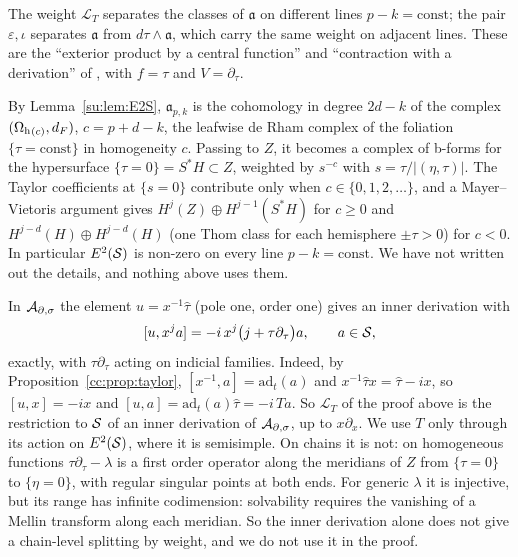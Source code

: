 The weight \(\mathcal L_T\) separates the classes of \(\mathfrak a\) on
different lines \(p-k=\mathrm{const}\); the pair \(\varepsilon,\iota\)
separates \(\mathfrak a\) from \(d\tau\wedge\mathfrak a\), which carry
the same weight on adjacent lines. These are the ``exterior product by a
central function'' and ``contraction with a derivation'' of
\cite[Prop.~5.1]{LauterMoroianu}, with \(f=\tau\) and \(V=\partial_\tau\).

\begin{remark}
\label{su:rem:HS}
By Lemma~\ref{su:lem:E2S}, \(\mathfrak a_{p,k}\) is the cohomology in
degree \(2d-k\) of the complex \((\Omega_{\mathrm h}{}_{(c)},d_F)\), \(c=p+d-k\), the
leafwise de Rham complex of the foliation \(\{\tau=\mathrm{const}\}\) in
homogeneity \(c\). Passing to \(Z\), it becomes a complex of b-forms for
the hypersurface \(\{\tau=0\}=S^*H\subset Z\), weighted by \(s^{-c}\)
with \(s=\tau/|(\eta,\tau)|\). The Taylor coefficients at \(\{s=0\}\)
contribute only when \(c\in\{0,1,2,\dots\}\), and a Mayer--Vietoris
argument gives \(H^j(Z)\oplus H^{j-1}(S^*H)\) for \(c\ge0\) and
\(H^{j-d}(H)\oplus H^{j-d}(H)\) (one Thom class for each hemisphere
\(\pm\tau>0\)) for \(c<0\). In particular \(E^2(\mathcal S)\) is non-zero on
every line \(p-k=\mathrm{const}\). We have not written out the details,
and nothing above uses them.
\end{remark}

\begin{remark}\label{su:rem:euler}
In \(\mathcal A_{\partial,\sigma}\) the element \(u=x^{-1}\hat\tau\) (pole one, order one) gives
an inner derivation with
\[
 [u,x^ja]=-i\,x^j\bigl(j+\tau\partial_\tau\bigr)a,\qquad a\in\mathcal S,
\]
exactly, with \(\tau\partial_\tau\) acting on indicial families. Indeed,
by Proposition~\ref{cc:prop:taylor}, \([x^{-1},a]=\mathrm{ad}_t(a)\) and
\(x^{-1}\hat\tau x=\hat\tau-ix\), so \([u,x]=-ix\) and
\([u,a]=\mathrm{ad}_t(a)\hat\tau=-i\,Ta\). So \(\mathcal L_T\) of the proof
above is the restriction to \(\mathcal S\) of an inner derivation of \(\mathcal A_{\partial,\sigma}\),
up to \(x\partial_x\). We use \(T\) only through its action on
\(E^2(\mathcal S)\), where it is semisimple. On chains it is not: on
homogeneous functions \(\tau\partial_\tau-\lambda\) is a first order
operator along the meridians of \(Z\) from \(\{\tau=0\}\) to
\(\{\eta=0\}\), with regular singular points at both ends. For generic
\(\lambda\) it is injective, but its range has infinite codimension:
solvability requires the vanishing of a Mellin transform along each
meridian. So the inner derivation alone does not give a chain-level
splitting by weight, and we do not use it in the proof.
\end{remark}

